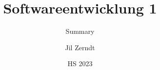 \documentclass[a4paper, fontsize = 8pt, landscape]{scrartcl}
\title{Softwareentwicklung 1}
\subtitle{Summary}
\author{Jil Zerndt}
\date{HS 2023}
\begin{document}
\begin{multicols}{2}
	\thispagestyle{TitlePageStyle}
	\maketitleinfo
	\sffamily
	
	\raggedcolumns
	\columnbreak 
\end{multicols}
\end{document}
